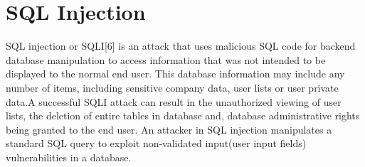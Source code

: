 \section{SQL Injection}

SQL injection or SQLI[6] is an attack that uses malicious SQL code for backend database manipulation to access information that was not intended to be displayed to the normal end user. This database information may include any number of items, including sensitive company data, user lists or user private data.A successful SQLI attack can result in the unauthorized viewing of user lists, the deletion of entire tables in database and, database administrative rights being granted to the end user. An attacker in SQL injection manipulates a standard SQL query to exploit non-validated input(user input fields) vulnerabilities in a database. 
